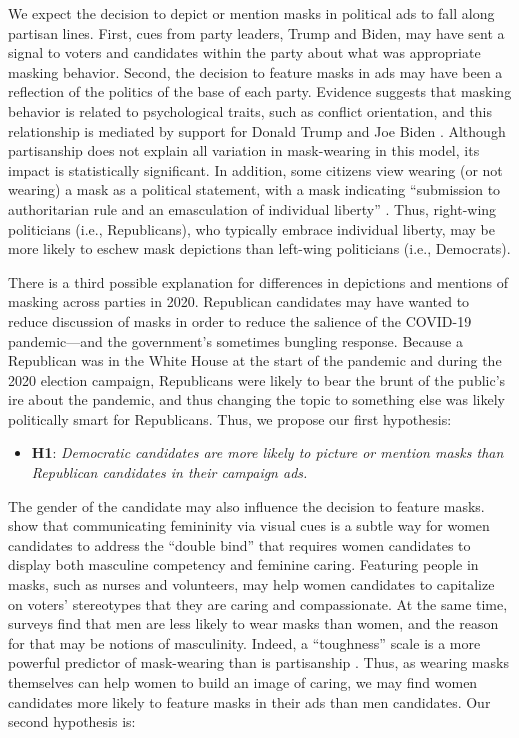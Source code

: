 We expect the decision to depict or mention masks in political ads to fall along partisan lines.  First, cues from party leaders, Trump and Biden, may have sent a signal to voters and candidates within the party about what was appropriate masking behavior.  Second, the decision to feature masks in ads may have been a reflection of the politics of the base of each party. Evidence suggests that masking behavior is related to psychological traits, such as conflict orientation, and this relationship is mediated by support for Donald Trump and Joe Biden \parencite{young_politics_2022}. Although partisanship does not explain all variation in mask-wearing in this model, its impact is statistically significant. In addition, some citizens view wearing (or not wearing) a mask as a political statement, with a mask indicating ``submission to authoritarian rule and an emasculation of individual liberty'' \parencite{ike_face_2020}.  Thus, right-wing politicians (i.e., Republicans), who typically embrace individual liberty, may be more likely to eschew mask depictions than left-wing politicians (i.e., Democrats).

There is a third possible explanation for differences in depictions and mentions of masking across parties in 2020.  Republican candidates may have wanted to reduce discussion of masks in order to reduce the salience of the COVID-19 pandemic---and the government's sometimes bungling response. Because a Republican was in the White House at the start of the pandemic and during the 2020 election campaign, Republicans were likely to bear the brunt of the public's ire about the pandemic, and thus changing the topic to something else was likely politically smart for Republicans.  Thus, we propose our first hypothesis:

\begin{itemize}
\item[]
\textbf{H1}: \textit{Democratic candidates are more likely to picture or mention masks than Republican candidates in their campaign ads.}
\end{itemize}

The gender of the candidate may also influence the decision to feature masks. \cite{carpinella2021visual} show that communicating femininity via visual cues is a subtle way for women candidates to address the ``double bind'' \parencite{dittmar2015navigating} that requires women candidates to display both masculine competency and feminine caring. Featuring people in masks, such as nurses and volunteers, may help women candidates to capitalize on voters' stereotypes that they are caring and compassionate. At the same time, surveys find that men are less likely to wear masks than women, and the reason for that may be notions of masculinity. Indeed, a ``toughness'' scale is a more powerful predictor of mask-wearing than is partisanship \parencite{palmer_toxic_2020}. Thus, as wearing masks themselves can help women to build an image of caring, we may find women candidates more likely to feature masks in their ads than men candidates.  Our second hypothesis is:

